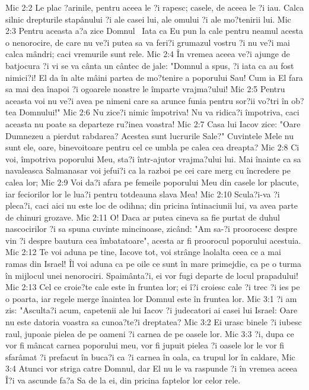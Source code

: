 Mic 2:2  Le plac ?arinile, pentru aceea le ?i rapesc; casele, de aceea le ?i iau. Calca silnic drepturile stapânului ?i ale casei lui, ale omului ?i ale mo?tenirii lui.
Mic 2:3  Pentru aceasta a?a zice Domnul  Iata ca Eu pun la cale pentru neamul acesta o nenorocire, de care nu ve?i putea sa va feri?i grumazul vostru ?i nu ve?i mai calca mândri; caci vremurile sunt rele.
Mic 2:4  În vremea aceea ve?i ajunge de batjocura ?i vi se va cânta un cântec de jale: "Domnul a spus, ?i iata ca au fost nimici?i! El da în alte mâini partea de mo?tenire a poporului Sau! Cum ia El fara sa mai dea înapoi ?i ogoarele noastre le împarte vrajma?ului!
Mic 2:5  Pentru aceasta voi nu ve?i avea pe nimeni care sa arunce funia pentru sor?ii vo?tri în ob?tea Domnului!"
Mic 2:6  Nu zice?i nimic împotriva! Nu va ridica?i împotriva, caci aceasta nu poate sa departeze ru?inea voastra!
Mic 2:7  Casa lui Iacov zice: "Oare Dumnezeu a pierdut rabdarea? Acestea sunt lucrurile Sale?" Cuvintele Mele nu sunt ele, oare, binevoitoare pentru cel ce umbla pe calea cea dreapta?
Mic 2:8  Ci voi, împotriva poporului Meu, sta?i într-ajutor vrajma?ului lui. Mai înainte ca sa navaleasca Salmanasar voi jefui?i ca la razboi pe cei care merg cu încredere pe calea lor;
Mic 2:9  Voi da?i afara pe femeile poporului Meu din casele lor placute, iar feciorilor lor le lua?i pentru totdeauna slava Mea!
Mic 2:10  Scula?i-va ?i pleca?i, caci aici nu este loc de odihna; din pricina întinaciunii lui, va avea parte de chinuri grozave.
Mic 2:11  O! Daca ar putea cineva sa fie purtat de duhul nascocirilor ?i sa spuna cuvinte mincinoase, zicând: "Am sa-?i proorocesc despre vin ?i despre bautura cea îmbatatoare", acesta ar fi proorocul poporului acestuia.
Mic 2:12  Te voi aduna pe tine, Iacove tot, voi strânge laolalta ceea ce a mai ramas din Israel! Îl voi aduna ca pe oile ce sunt în mare primejdie, ca pe o turma în mijlocul unei nenorociri. Spaimânta?i, ei vor fugi departe de locul prapadului!
Mic 2:13  Cel ce croie?te cale este în fruntea lor; ei î?i croiesc cale ?i trec ?i ies pe o poarta, iar regele merge înaintea lor Domnul este în fruntea lor.
Mic 3:1  ?i am zis: "Asculta?i acum, capetenii ale lui Iacov ?i judecatori ai casei lui Israel: Oare nu este datoria voastra sa cunoa?te?i dreptatea?
Mic 3:2  Ei urasc binele ?i iubesc raul, jupoaie pielea de pe oameni ?i carnea de pe oasele lor.
Mic 3:3  ?i, dupa ce vor fi mâncat carnea poporului meu, vor fi jupuit pielea ?i oasele lor le vor fi sfarâmat ?i prefacut în buca?i ca ?i carnea în oala, ca trupul lor în caldare,
Mic 3:4  Atunci vor striga catre Domnul, dar El nu le va raspunde ?i în vremea aceea Î?i va ascunde fa?a Sa de la ei, din pricina faptelor lor celor rele.
